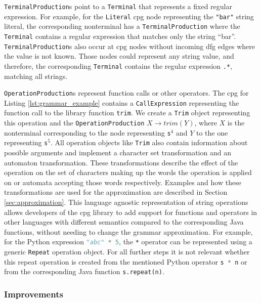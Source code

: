 \lstinline|TerminalProduction|s point to a \lstinline|Terminal| that represents a fixed regular expression.
For example, for the \lstinline|Literal| \ac{cpg} node representing the \lstinline|"bar"| string literal, the corresponding nonterminal has a \lstinline|TerminalProduction| where the \lstinline|Terminal| contains a regular expression that matches only the string \enquote{bar}. \lstinline|TerminalProduction|s also occur at \ac{cpg} nodes without incoming \ac{dfg} edges where the value is not known. Those nodes could represent any string value, and therefore, the corresponding \lstinline|Terminal| contains the regular expression \lstinline|.*|, matching all strings.

\lstinline|OperationProduction|s represent function calls or other operators. The \ac{cpg} for Listing \ref{lst:grammar_example} contains a \lstinline|CallExpression| representing the function call to the library function \lstinline|trim|. We create a \lstinline|Trim| object representing this operation and the \lstinline|OperationProduction| $X \rightarrow trim(Y)$, where $X$ is the nonterminal corresponding to the node representing \lstinline|s|$^4$ and $Y$ to the one representing \lstinline|s|$^5$. 
All operation objects like \lstinline|Trim| also contain information about possible arguments and implement a character set transformation and an automaton transformation. These transformations describe the effect of the operation on the set of characters making up the words the operation is applied on or automata accepting those words respectively.
Examples and how these transformations are used for the approximation are described in Section \ref{sec:approximation}.
This language agnostic representation of string operations allows developers of the \ac{cpg} library to add support for functions and operators in other languages with different semantics compared to the corresponding Java functions, without needing to change the grammar approximation. For example, for the Python expression \lstinline[language=Python]|"abc" * 5|, the \lstinline|*| operator can be represented using a generic \lstinline|Repeat| operation object. For all further steps it is not relevant whether this repeat operation is created from the mentioned Python operator \lstinline[language=Python]|s * n| or from the corresponding Java function \lstinline|s.repeat(n)|. 


\subsubsection{Improvements}

